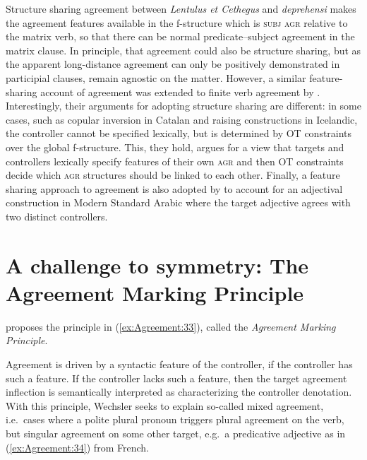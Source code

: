 \documentclass[output=paper,hidelinks]{langscibook}
\begin{document}
Structure sharing agreement between \textit{Lentulus et Cethegus} and
\textit{deprehensi} makes the agreement features available in the f-structure
which is \textsc{subj agr} relative to the matrix verb, so that there
can be normal predicate--subject agreement in the matrix clause. In
principle, that agreement could also be structure sharing, but as the
apparent long-distance agreement can only be positively demonstrated
in participial clauses, \citet{haug-nikitina2015} remain agnostic
on the matter. However, a similar feature-sharing account of agreement
was extended to finite verb agreement by
\citet{AV:LFG14,AlsinaVigo17}. Interestingly, their arguments for
adopting structure sharing are different: in some cases, such as
copular inversion in Catalan and raising constructions in Icelandic,
the controller cannot be specified lexically, but is determined by OT
constraints over the global f-structure. This, they hold, argues for a
view that targets and controllers lexically specify features of their
own \textsc{agr} and then OT constraints decide which \textsc{agr} structures should be linked to each other. Finally, a feature sharing approach to agreement is also adopted by \citet{Sadler:NomMod} to account for an adjectival construction in Modern Standard Arabic where the target adjective agrees with two distinct controllers.

\section{A challenge to symmetry: The Agreement Marking Principle}\label{sec:agreementmarking}
\citet{Wechsler:Mixed} proposes the principle in (\ref{ex:Agreement:33}), called the \textit{Agreement Marking Principle}.

\ea\label{ex:Agreement:33}\label{ex:AgreementMarking}
Agreement is driven by a syntactic feature of the controller, if
the controller has such a feature. If the controller lacks such a
feature, then the target agreement inflection is semantically
interpreted as characterizing the controller denotation.
\z
With this principle, Wechsler seeks to explain so-called mixed
agreement, i.e.\ cases where a polite plural pronoun triggers plural
agreement on the verb, but singular agreement on some other target,
e.g.\ a predicative adjective as in (\ref{ex:Agreement:34}) from French.
\end{document}
